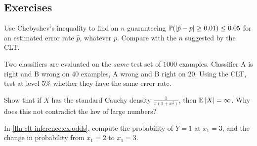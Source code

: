 \begin{notechapter}
\section*{Exercises}

\begin{exercise}\label{lln-clt-inference:exr:1}
Use Chebyshev's inequality to find an $n$ guaranteeing
$\mathbb{P}(\left|\hat p - p\right|\geq0.01)\leq0.05$ for an estimated error rate $\hat p$,
whatever $p$. Compare with the $n$ suggested by the CLT.
\end{exercise}

\begin{exercise}\label{lln-clt-inference:exr:2}
Two classifiers are evaluated on the \emph{same} test set of $1000$ examples.
Classifier A is right and B wrong on $40$ examples, A wrong and B right on $20$.
Using the CLT, test at level $5\%$ whether they have the same error rate.
\end{exercise}

\begin{exercise}\label{lln-clt-inference:exr:3}
Show that if $X$ has the standard Cauchy density $\frac1{\pi(1+x^2)}$, then
$\mathbb{E}\left|X\right| = \infty$. Why does this not contradict the law of large numbers?
\end{exercise}

\begin{exercise}\label{lln-clt-inference:exr:4}
In \cref{lln-clt-inference:ex:odds}, compute the probability of $Y = 1$ at
$x_1 = 3$, and the change in probability from $x_1 = 2$ to $x_1 = 3$.
\end{exercise}
\end{notechapter}
